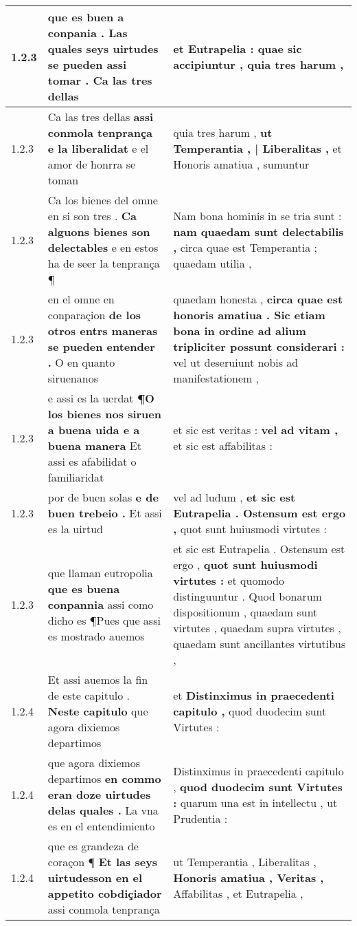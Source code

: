 \begin{tabular}{|p{1cm}|p{6.5cm}|p{6.5cm}|}
1.2.3 & que es buen a conpania . \textbf{ Las quales seys uirtudes se pueden assi tomar . } Ca las tres dellas & et Eutrapelia : \textbf{ quae sic accipiuntur , } quia tres harum , \\\hline
1.2.3 & Ca las tres dellas \textbf{ assi conmola tenprança e la liberalidat } e el amor de honrra se toman & quia tres harum , \textbf{ ut Temperantia , | Liberalitas , } et Honoris amatiua , sumuntur \\\hline
1.2.3 & Ca los bienes del omne en si son tres . \textbf{ Ca alguons bienes son delectables } e en estos ha de seer la tenprança ¶ & Nam bona hominis in se tria sunt : \textbf{ nam quaedam sunt delectabilis , } circa quae est Temperantia ; quaedam utilia , \\\hline
1.2.3 & en el omne en conparaçion \textbf{ de los otros entrs maneras se pueden entender . } O en quanto siruenanos & quaedam honesta , \textbf{ circa quae est honoris amatiua . Sic etiam bona in ordine ad alium tripliciter possunt considerari : } vel ut deseruiunt nobis ad manifestationem , \\\hline
1.2.3 & e assi es la uerdat \textbf{ ¶O los bienes nos siruen a buena uida e a buena manera } Et assi es afabilidat o familiaridat & et sic est veritas : \textbf{ vel ad vitam , } et sic est affabilitas : \\\hline
1.2.3 & por de buen solas \textbf{ e de buen trebeio . } Et assi es la uirtud & vel ad ludum , \textbf{ et sic est Eutrapelia . Ostensum est ergo , } quot sunt huiusmodi virtutes : \\\hline
1.2.3 & que llaman eutropolia \textbf{ que es buena conpannia } assi como dicho es ¶Pues que assi es mostrado auemos & et sic est Eutrapelia . Ostensum est ergo , \textbf{ quot sunt huiusmodi virtutes : } et quomodo distinguuntur . Quod bonarum dispositionum , quaedam sunt virtutes , quaedam supra virtutes , quaedam sunt ancillantes virtutibus , \\\hline
1.2.4 & Et assi auemos la fin de este capitulo . \textbf{ Neste capitulo } que agora dixiemos departimos & et \textbf{ Distinximus in praecedenti capitulo , } quod duodecim sunt Virtutes : \\\hline
1.2.4 & que agora dixiemos departimos \textbf{ en commo eran doze uirtudes delas quales . } La vna es en el entendimiento & Distinximus in praecedenti capitulo , \textbf{ quod duodecim sunt Virtutes : } quarum una est in intellectu , ut Prudentia : \\\hline
1.2.4 & que es grandeza de coraçon ¶ \textbf{ Et las seys uirtudesson en el appetito cobdiçiador } assi conmola tenprança & ut Temperantia , Liberalitas , \textbf{ Honoris amatiua , Veritas , } Affabilitas , et Eutrapelia , \\\hline

\end{tabular}
